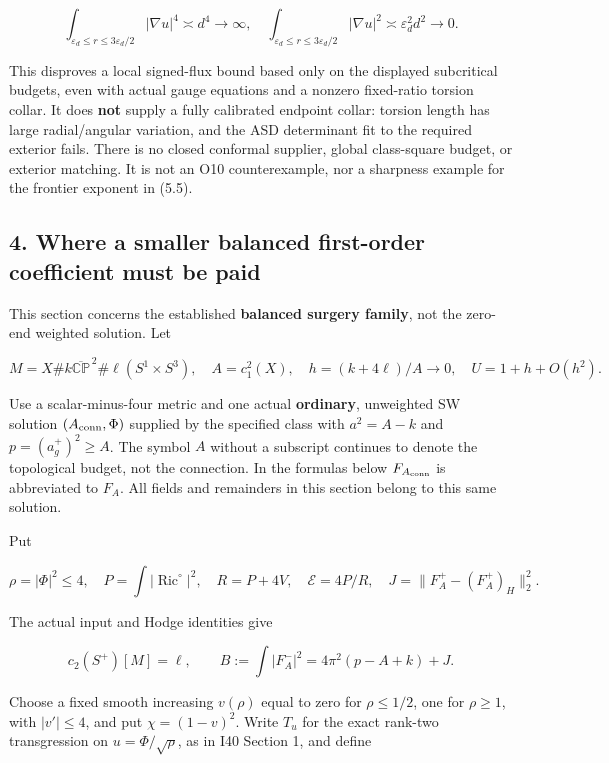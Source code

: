 \documentclass[
  10pt,
]{article}
\begin{document}
\[
 \int_{\varepsilon_d\le r\le3\varepsilon_d/2}|\nabla u|^4
                    \asymp d^4\longrightarrow\infty,
 \quad
 \int_{\varepsilon_d\le r\le3\varepsilon_d/2}|\nabla u|^2
                    \asymp\varepsilon_d^2d^2\longrightarrow0.
 \tag{3.14}
\]

This disproves a local signed-flux bound based only on the displayed
subcritical budgets, even with actual gauge equations and a nonzero
fixed-ratio torsion collar. It does \textbf{not} supply a fully
calibrated endpoint collar: torsion length has large radial/angular
variation, and the ASD determinant fit to the required exterior fails.
There is no closed conformal supplier, global class-square budget, or
exterior matching. It is not an O10 counterexample, nor a sharpness
example for the frontier exponent in (5.5).

\hypertarget{where-a-smaller-balanced-first-order-coefficient-must-be-paid}{%
\subsection{4. Where a smaller balanced first-order coefficient must be
paid}\label{where-a-smaller-balanced-first-order-coefficient-must-be-paid}}

This section concerns the established \textbf{balanced surgery family},
not the zero-end weighted solution. Let

\[
 M=X\#k\overline{\mathbb {CP}}^{\,2}
       \#\ell(S^1\times S^3),\quad A=c_1^2(X),\quad
 h=(k+4\ell)/A\to0,\quad U=1+h+O(h^2).
 \tag{4.1}
\]

Use a scalar-minus-four metric and one actual \textbf{ordinary},
unweighted SW solution \((A_{\rm conn},\Phi)\) supplied by the specified
class with \(a^2=A-k\) and \(p=(a_g^+)^2\ge A\). The symbol \(A\)
without a subscript continues to denote the topological budget, not the
connection. In the formulas below \(F_{A_{\rm conn}}\) is abbreviated to
\(F_A\). All fields and remainders in this section belong to this same
solution.

Put

\[
 \rho=|\Phi|^2\le4,\quad P=\int|\operatorname{Ric}^{\circ}|^2,
 \quad R=P+4V,\quad \mathcal E=4P/R,
 \quad J=\|F_A^+-(F_A^+)_H\|_2^2.
\]

The actual input and Hodge identities give

\[
 c_2(S^+)[M]=\ell,\qquad
 B:=\int|F_A^-|^2=4\pi^2(p-A+k)+J.
 \tag{4.2}
\]

Choose a fixed smooth increasing \(v(\rho)\) equal to zero for
\(\rho\le1/2\), one for \(\rho\ge1\), with \(|v'|\le4\), and put
\(\chi=(1-v)^2\). Write \(T_u\) for the exact rank-two transgression on
\(u=\Phi/\sqrt\rho\), as in I40 Section 1, and define
\end{document}
